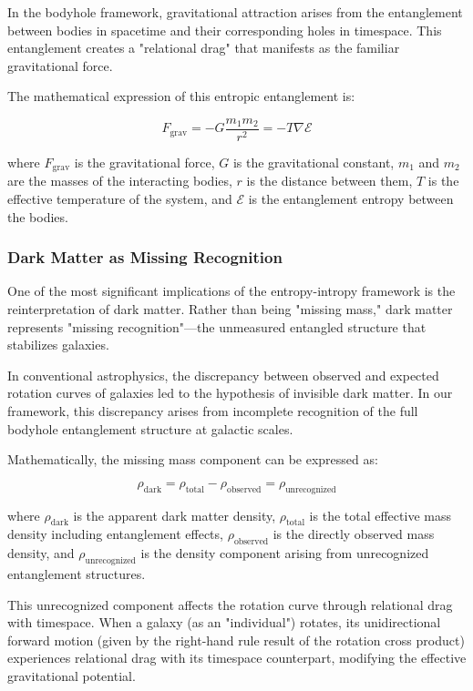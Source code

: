 \documentclass{article}
\begin{document}
In the bodyhole framework, gravitational attraction arises from the entanglement between bodies in spacetime and their corresponding holes in timespace. This entanglement creates a "relational drag" that manifests as the familiar gravitational force.

The mathematical expression of this entropic entanglement is:

\begin{equation}
F_{\text{grav}} = -G \frac{m_1 m_2}{r^2} = -T \nabla \mathcal{E}
\end{equation}

where $F_{\text{grav}}$ is the gravitational force, $G$ is the gravitational constant, $m_1$ and $m_2$ are the masses of the interacting bodies, $r$ is the distance between them, $T$ is the effective temperature of the system, and $\mathcal{E}$ is the entanglement entropy between the bodies.

\subsubsection{Dark Matter as Missing Recognition}

One of the most significant implications of the entropy-intropy framework is the reinterpretation of dark matter. Rather than being "missing mass," dark matter represents "missing recognition"—the unmeasured entangled structure that stabilizes galaxies.

In conventional astrophysics, the discrepancy between observed and expected rotation curves of galaxies led to the hypothesis of invisible dark matter. In our framework, this discrepancy arises from incomplete recognition of the full bodyhole entanglement structure at galactic scales.

Mathematically, the missing mass component can be expressed as:

\begin{equation}
\rho_{\text{dark}} = \rho_{\text{total}} - \rho_{\text{observed}} = \rho_{\text{unrecognized}}
\end{equation}

where $\rho_{\text{dark}}$ is the apparent dark matter density, $\rho_{\text{total}}$ is the total effective mass density including entanglement effects, $\rho_{\text{observed}}$ is the directly observed mass density, and $\rho_{\text{unrecognized}}$ is the density component arising from unrecognized entanglement structures.

This unrecognized component affects the rotation curve through relational drag with timespace. When a galaxy (as an "individual") rotates, its unidirectional forward motion (given by the right-hand rule result of the rotation cross product) experiences relational drag with its timespace counterpart, modifying the effective gravitational potential.
\end{document}
